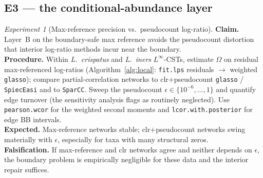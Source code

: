 \documentclass[11pt]{article}
\theoremstyle{definition}
\theoremstyle{plain}
\theoremstyle{remark}
\newtheorem{experiment}{Experiment}
\newcommand{\Linf}{L^{\infty}}
\newcommand{\1}{\mathbf{1}}
\newcommand{\Prec}{\Omega}
\begin{document}
\subsection{E3 --- the conditional-abundance layer}
\begin{experiment}[Max-reference precision vs.\ pseudocount log-ratio]\label{exp:layerB}
\textbf{Claim.} Layer~B on the boundary-safe max reference avoids the
pseudocount distortion that interior log-ratio methods incur near the boundary.\\
\textbf{Procedure.} Within \emph{L.\ crispatus} and \emph{L.\ iners}
$\Linf$-CSTs, estimate $\Prec$ on residual max-referenced log-ratios
(Algorithm~\ref{alg:local}: \texttt{fit.lps} residuals $\to$ weighted
\texttt{glasso}); compare partial-correlation networks to clr$+$pseudocount
\texttt{glasso} / \texttt{SpiecEasi} and to \texttt{SparCC}. Sweep the pseudocount
$\epsilon\in\{10^{-6},\dots,1\}$ and quantify edge turnover (the sensitivity
analysis \cite{linf} flags as routinely neglected). Use \texttt{pearson.wcor} for
the weighted second moments and \texttt{lcor.with.posterior} for edge BB
intervals.\\
\textbf{Expected.} Max-reference networks stable; clr$+$pseudocount networks
swing materially with $\epsilon$, especially for taxa with many structural zeros.\\
\textbf{Falsification.} If max-reference and clr networks agree and neither
depends on $\epsilon$, the boundary problem is empirically negligible for these
data and the interior repair suffices.
\end{experiment}

\end{document}
